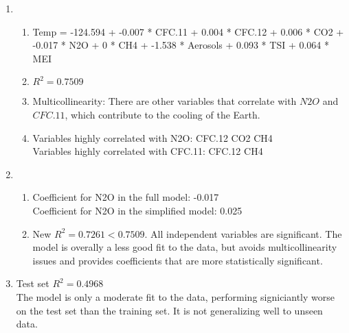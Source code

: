\documentclass{article}
\begin{document}
\newcommand{\documentcourse}{IIMT2641}
\newcommand{\documentnumber}{3}





\begin{enumerate}[label=\alph*.]
      \item
            \begin{enumerate}[label=\roman*.]
                  \item Temp = -124.594 + -0.007 * CFC.11 + 0.004 * CFC.12 + 0.006 * CO2 + -0.017 * N2O + 0 * CH4 + -1.538 * Aerosols + 0.093 * TSI + 0.064 * MEI
                  \item $R^2=0.7509$
                  \item Multicollinearity: There are other variables that correlate with $N2O$ and $CFC.11$, which contribute to the cooling of the Earth.
                  \item Variables highly correlated with N2O: CFC.12 CO2 CH4\\
                        Variables highly correlated with CFC.11: CFC.12 CH4
            \end{enumerate}
      \item
            \begin{enumerate}[label=\roman*.]
                  \item Coefficient for N2O in the full model: -0.017 \\
                        Coefficient for N2O in the simplified model: 0.025
                  \item New $R^2=0.7261 < 0.7509$. All independent variables are significant. The model is overally a less good fit to the data, but avoids multicollinearity issues and provides coefficients that are more statistically significant.
            \end{enumerate}
      \item Test set $R^2 = 0.4968$\\ The model is only a moderate fit to the data, performing signiciantly worse on the test set than the training set. It is not generalizing well to unseen data.
\end{enumerate}
\end{document}
